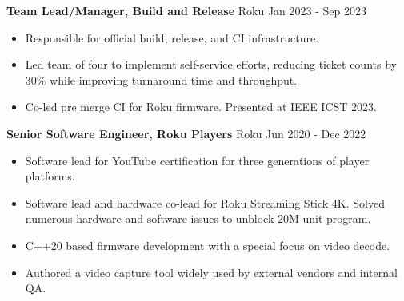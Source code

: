 \textbf{Team Lead/Manager, Build and Release} Roku \hfill Jan 2023 - Sep 2023

\begin{itemize} \itemsep -2pt
\item Responsible for official build, release, and CI infrastructure.
\item Led team of four to implement self-service efforts, reducing ticket counts by 30\% while improving turnaround time and throughput.
\item Co-led pre merge CI for Roku firmware. Presented at IEEE ICST 2023.
\end{itemize}

\textbf{Senior Software Engineer, Roku Players} Roku \hfill Jun 2020 - Dec 2022
\begin{itemize} \itemsep -2pt
\item Software lead for YouTube certification for three generations of player platforms.
\item Software lead and hardware co-lead for Roku Streaming Stick 4K. Solved numerous hardware and software issues to unblock 20M unit program.
\item C++20 based firmware development with a special focus on video decode.
\item Authored a video capture tool widely used by external vendors and internal QA.
\end{itemize}
